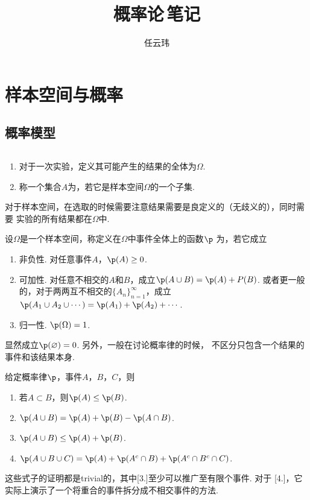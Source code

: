 

\title{概率论$\,$笔记}
\author{任云玮}
\date{}


\maketitle
\tableofcontents
\newpage

\section{样本空间与概率}

\subsection{概率模型}

  \begin{defi}
    $\,$
    \begin{enumerate}
      \item 对于一次实验，定义其可能产生的结果的全体为$\Omega$.
      \item 称一个集合$A$为，若它是样本空间$\Omega$的一个子集.
    \end{enumerate}
  \end{defi}
  \remark
    对于样本空间，在选取的时候需要注意结果需要是良定义的（无歧义的），同时需要
    实验的所有结果都在$\Omega$中.

  \begin{defi}[概率律]
    \label{defi: 概率律}
    设$\Omega$是一个样本空间，称定义在$\Omega$中事件全体上的函数$\p$
    为，若它成立
    \begin{enumerate}
      \item 非负性. 对任意事件$A$，$\p(A)\ge 0$.
      \item 可加性. 对任意不相交的$A$和$B$，成立$\p(A\cup B)=\p(A)+P(B)$.
        或者更一般的，对于两两互不相交的$\{A_n\}_{n=1}^\infty$，成立
        $\p(A_1\cup A_2\cup\cdots) = \p(A_1) + \p(A_2) + \cdots$.
      \item 归一性. $\p(\Omega)=1$.
    \end{enumerate}
  \end{defi}
  \remark
    显然成立$\p(\varnothing) = 0$. 另外，一般在讨论概率律的时候，
    不区分只包含一个结果的事件和该结果本身.

  \begin{thm}[概率律的性质]
    \label{thm: 概率律的性质}
    给定概率律$\p$，事件$A$，$B$，$C$，则
    \begin{enumerate}
      \item 若$A\subset B$，则$\p(A)\le \p(B)$.
      \item $\p(A\cup B) = \p(A) + \p(B) - \p(A\cap B)$.
      \item $\p(A\cup B) \le \p(A) + \p(B)$.
      \item $\p(A\cup B\cup C) = \p(A) + \p(A^c\cap B) +
        \p(A^c \cap B^c \cap C)$.
    \end{enumerate}
  \end{thm}
  \remark
    这些式子的证明都是trivial的，其中[3.]至少可以推广至有限个事件. 对于
    [4.]，它实际上演示了一个将重合的事件拆分成不相交事件的方法.

